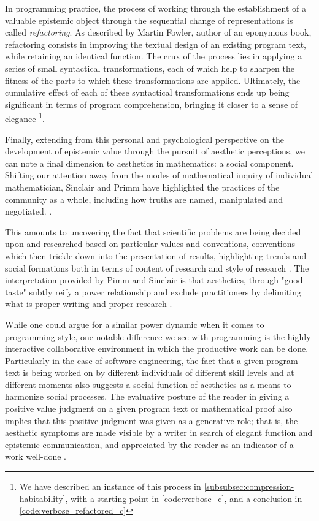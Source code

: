 In programming practice, the process of working through the establishment of a valuable epistemic object through the sequential change of representations is called \emph{refactoring}. As described by Martin Fowler, author of an eponymous book, refactoring consists in improving the textual design of an existing program text, while retaining an identical function. The crux of the process lies in applying a series of small syntactical transformations, each of which help to sharpen the fitness of the parts to which these transformations are applied. Ultimately, the cumulative effect of each of these syntactical transformations ends up being significant in terms of program comprehension, bringing it closer to a sense of elegance \citep{fowler_refactoring_1999}\footnote{We have described an instance of this process in \ref{subsubsec:compression-habitability}, with a starting point in \ref{code:verbose_c}, and a conclusion in \ref{code:verbose_refactored_c}}.

Finally, extending from this personal and psychological perspective on the development of epistemic value through the pursuit of aesthetic perceptions, we can note a final dimension to aesthetics in mathematics: a social component. Shifting our attention away from the modes of mathematical inquiry of individual mathematician, Sinclair and Primm have highlighted the practices of the community as a whole, including how truths are named, manipulated and negotiated. \citep{sinclair_aesthetic_2011}.

This amounts to uncovering the fact that scientific problems are being decided upon and researched based on particular values and conventions, conventions which then trickle down into the presentation of results, highlighting trends and social formations both in terms of content of research and style of research \citep{depaz_stylistique_2023}. The interpretation provided by Pimm and Sinclair is that aesthetics, through "good taste" subtly reify a power relationship and exclude practitioners by delimiting what is proper writing and proper research \citep{sinclair_many_2010}.

While one could argue for a similar power dynamic when it comes to programming style, one notable difference we see with programming is the highly interactive collaborative environment in which the productive work can be done. Particularly in the case of software engineering, the fact that a given program text is being worked on by different individuals of different skill levels and at different moments also suggests a social function of aesthetics as a means to harmonize social processes. The evaluative posture of the reader in giving a positive value judgment on a given program text or mathematical proof also implies that this positive judgment was given as a generative role; that is, the aesthetic symptoms are made visible by a writer in search of elegant function and epistemic communication, and appreciated by the reader as an indicator of a work well-done \citep{tomov_role_2016a}.

